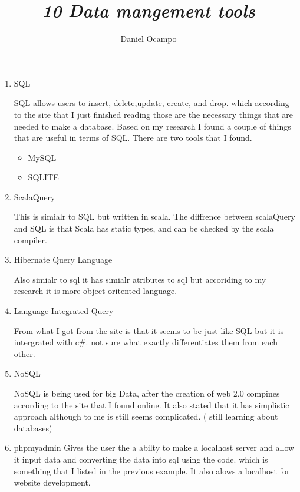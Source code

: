 \documentclass{article}
\title{\emph{ 10 Data mangement tools  }}
\author{Daniel Ocampo}
\begin{document}
\maketitle 
\linespread{1.0}\selectfont

\begin{enumerate}
\item SQL 

SQL allows users to insert, delete,update, create, and drop. which according to the site that I just finished reading those are the necessary things that are needed to make a database. Based on my research I found a couple of things that are useful in terms of SQL. There are two tools that I found.

\begin{itemize}
\item MySQL
\item SQLITE



\end{itemize} 

\item ScalaQuery

This is simialr to SQL but written in scala. The diffrence between scalaQuery and SQL is that Scala has static types, and can be checked by the scala compiler.     

\item Hibernate Query Language 

Also simialr to sql it has  simialr atributes to sql but accoriding to my research it is more object oritented language. 


\item Language-Integrated Query

From what I got from the site is that it seems to be just like SQL but it is intergrated with c\#. not sure what exactly differentiates them from each other.


\item NoSQL



NoSQL is being used for big Data, after the creation of web 2.0 compines according to the site that I found online. It also stated that it has simplistic approach although to me is still seems complicated. ( still learning about databases)

\item phpmyadmin
Gives the user the a abilty to make a localhost server and allow it input data and converting the data into sql using the code. which is something that I listed in the previous example. It also alows a localhost for website development. 


\end{enumerate}
\end{document}
